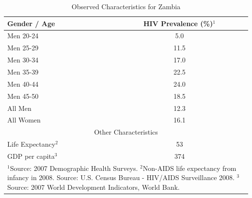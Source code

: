 \documentclass[12pt]{article}
\begin{document}
\begin{table}
\begin{center}
\caption{Observed Characteristics for Zambia}\label{tb:data}
\vspace*{1pc}
\begin{tabular}{l|c}\hline\hline
Gender / Age & HIV Prevalence (\%)$^{1}$ \\\hline
Men 20-24 & 5.0  \\
Men 25-29 & 11.5 \\
Men 30-34 & 17.0 \\
Men 35-39 & 22.5 \\
Men 40-44 & 24.0 \\
Men 45-50 & 18.5 \\
All Men   & 12.3 \\
All Women & 16.1 \\ \hline\hline
\multicolumn{2}{c}{Other Characteristics} \\\hline
Life Expectancy$^{2}$ & 53  \\
GDP per capita$^{3}$ & 374  \\ \hline\hline
\multicolumn{2}{p{3in}}{
\footnotesize{
$^{1}$Source: 2007 Demographic Health Surveys.\newline
$^{2}$Non-AIDS life expectancy from infancy in 2008. Source: U.S. Census Bureau - HIV/AIDS Surveillance 2008.\newline
$^{3}$Source: 2007 World Development Indicators, World Bank.\newline
}} \\
\end{tabular}
\end{center}
\end{table}
\end{document}
